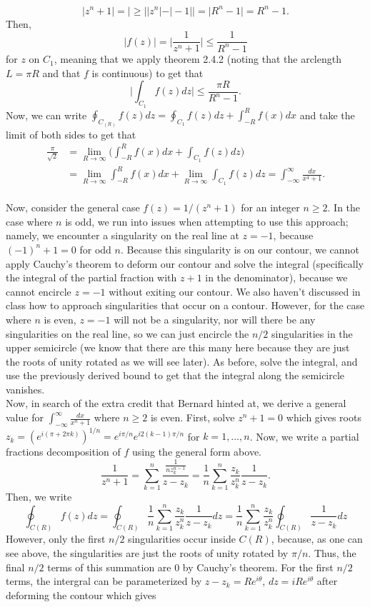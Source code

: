 \documentclass{article}
\begin{document}
\[
|z^n+1|=|\geq\big||z^n|-|-1|\big|=|R^n-1|=R^n-1.
\]
Then,
\[
|f(z)|=\bigg|\frac{1}{z^n+1}\bigg|\leq\frac{1}{R^n-1}
\]
for $z$ on $C_1$, meaning that we apply theorem 2.4.2 (noting that the arclength $L=\pi R$ and that $f$ is continuous) to get that 
\[
\bigg|\int_{C_1} f(z)dz\bigg|\leq \frac{\pi R}{R^n-1}.
\]
Now, we can write $\oint_{C_{(R)}}f(z)dz=\oint_{C_1}f(z)dz+\int_{-R}^Rf(x)dx$ and take the limit of both sides to get that
\[
\begin{split}
\frac{\pi}{\sqrt{2}}&=\lim_{R\to\infty}\bigg(\int_{-R}^Rf(x)dx+\int_{C_1} f(z)dz\bigg)\\&=
\lim_{R\to\infty}\int_{-R}^Rf(x)dx+\lim_{R\to\infty}\int_{C_1} f(z)dz=\int_{-\infty}^\infty \frac{dx}{x^4+1}.
\end{split}
\]
\\Now, consider the general case $f(z)=1/(z^n+1)$ for an integer $n\geq2$. In the case where $n$ is odd, we run into issues when attempting to use this approach; namely, we encounter a singularity on the real line at $z=-1$, because $(-1)^n+1=0$ for odd $n$. Because this singularity is on our contour, we cannot apply Cauchy's theorem to deform our contour and solve the integral (specifically the integral of the partial fraction with $z+1$ in the denominator), because we cannot encircle $z=-1$ without exiting our contour. We also haven't discussed in class how to approach singularities that occur on a contour. However, for the case where $n$ is even, $z=-1$ will not be a singularity, nor will there be any singularities on the real line, so we can just encircle the $n/2$ singularities in the upper semicircle (we know that there are this many here because they are just the roots of unity rotated as we will see later). As before, solve the integral, and use the previously derived bound to get that the integral along the semicircle vanishes. \\
Now, in search of the extra credit that Bernard hinted at, we derive a general value for $\int_{-\infty}^\infty \frac{dx}{x^n+1}$ where $n\geq2$ is even. First, solve $z^n+1=0$ which gives roots $z_k=(e^{i(\pi+2\pi k)})^{1/n}=e^{i\pi/n}e^{i2(k-1)\pi/n}$ for $k=1,\ldots,n$. Now, we write a partial fractions decomposition of $f$ using the general form above.
\[
\frac{1}{z^n+1}=\sum_{k=1}^n\frac{\frac{1}{nz_k^{n-1}}}{z-z_k}=\frac{1}{n}\sum_{k=1}^n\frac{z_k}{z_k^n}\frac{1}{z-z_k}.
\]
Then, we write 
\[
\oint_{C(R)} f(z)dz=\oint_{C(R)}\frac{1}{n}\sum_{k=1}^n\frac{z_k}{z_k^n}\frac{1}{z-z_k}dz=\frac{1}{n}\sum_{k=1}^n\frac{z_k}{z_k^n}\oint_{C(R)}\frac{1}{z-z_k}dz
\]
However, only the first $n/2$ singularities occur inside $C(R)$, because, as one can see above, the singularities are just the roots of unity rotated by $\pi/n$. Thus, the final $n/2$ terms of this summation are 0 by Cauchy's theorem. For the first $n/2$ terms, the intergral can be parameterized by $z-z_k=Re^{i\theta}$, $dz=iRe^{i\theta}$ after deforming the contour which gives
\end{document}
